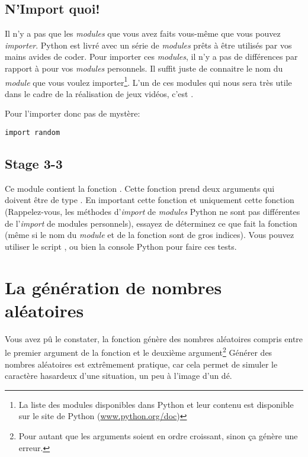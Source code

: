 \subsection{N'Import quoi!}

Il n'y a pas que les \emph{modules} que vous avez faits vous-même que vous pouvez \emph{importer}. Python est livré avec un série de \emph{modules} prêts à être utilisés par vos mains avides de coder.
Pour importer ces \emph{modules}, il n'y a pas de différences par rapport à pour vos \emph{modules} personnels. Il suffit juste de connaitre le nom du \emph{module} que vous voulez importer\footnote{La liste des modules disponibles dans Python et leur contenu est disponible sur le site de Python (\url{www.python.org/doc})}. L'un de ces modules qui nous sera très utile dans le cadre de la réalisation de jeux vidéos, c'est .

Pour l'importer donc pas de mystère:

\begin{lstlisting}
import random
\end{lstlisting}

\subsection{Stage 3-3}
Ce module contient la fonction . Cette fonction prend deux arguments qui doivent être de type .
En important cette fonction et uniquement cette fonction (Rappelez-vous, les méthodes d'\emph{import} de \emph{modules} Python ne sont pas différentes de l'\emph{import} de modules personnels), essayez de déterminez ce que fait la fonction (même si le nom du \emph{module} et de la fonction sont de gros indices).
Vous pouvez utiliser le script , ou bien la console Python pour faire ces tests.

\section{La génération de nombres aléatoires}

Vous avez pû le constater, la fonction  génère des nombres aléatoires compris entre le premier argument de la fonction et le deuxième argument\footnote{Pour autant que les arguments soient en ordre croissant, sinon ça génère une erreur.}
Générer des nombres aléatoires est extrêmement pratique, car cela permet de simuler le caractère hasardeux d'une situation, un peu à l'image d'un dé.

